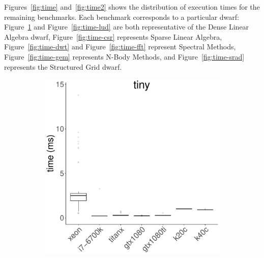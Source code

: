 \documentclass[../document.tex]{subfiles}
\begin{document}
Figures~\ref{fig:time} and~\ref{fig:time2} shows the distribution of execution times for the remaining benchmarks.
Each benchmark corresponds to a particular dwarf: Figure~\ref{fig:time-kmeans} and Figure~\ref{fig:time-lud} are both representative of the Dense Linear Algebra dwarf, Figure~\ref{fig:time-csr} represents Sparse Linear Algebra, Figure~\ref{fig:time-dwt} and Figure~\ref{fig:time-fft} represent Spectral Methods,
Figure~\ref{fig:time-gem} represents N-Body Methods, and Figure~\ref{fig:time-srad} represents the Structured Grid dwarf.

\captionsetup[subfigure]{justification=raggedright,singlelinecheck=false}

\begin{figure}
	\begin{subfigure}{0.09\textwidth} \label{fig:time-kmeans} \vspace{5mm}\end{subfigure}
	\begin{subfigure}{0.9\textwidth}
		\includegraphics[width=\plotwidth]{figures/time-results/generate_kmeans_no_knl_tiny_boxplot-1}

\end{subfigure}
\end{figure}
\end{document}
